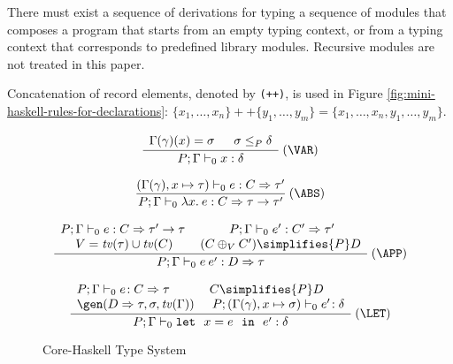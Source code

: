 
There must exist a sequence of derivations for typing a sequence of
modules that composes a program that starts from an empty typing
context, or from a typing context that corresponds to predefined
library modules. Recursive modules are not treated in this paper.

Concatenation of record elements, denoted by {\tt (++)}, is used in
Figure \ref{fig:mini-haskell-rules-for-declarations}: $\{ x_1, \ldots,
x_n \} ++ \{ y_1, \ldots, y_m \} = \{ x_1, \ldots, x_n, y_1,
\ldots, y_m \}$.


\begin{figure}
\[ \begin{array}{cc}
      \displaystyle\frac
        {\begin{array}[t]{lll}
           \Gamma(\gamma)(x) = \sigma\ & \:\sigma \leq_P \delta
         \end{array}}
        {P;\Gamma \vdash_0 x: \delta} \:(\VAR) \\ \\

	\displaystyle\frac
          {(\Gamma(\gamma),x \mapsto \tau) \vdash_0 e: C \Rightarrow \tau'}
	  {P;\Gamma \vdash_0 \lambda x.\:e: C\Rightarrow \tau \rightarrow \tau'} \:(\ABS)  \\ \\

	\displaystyle\frac
	  {\begin{array}[t]{cc}
             P;\Gamma \vdash_0 e: C \Rightarrow \tau' \rightarrow \tau\: &\:
             P;\Gamma \vdash_0 e': C' \Rightarrow \tau' \\
             V = \tv(\tau) \cup \tv(C) & (C \oplus_V C') \simplifies{P} D
           \end{array}}
	{P;\Gamma \vdash_0 e\:e': D\Rightarrow \tau} \:(\APP) \\ \\

	\displaystyle\frac
	 {\begin{array}{ll}
            P;\Gamma \vdash_0 e\!:C \Rightarrow \tau & C \simplifies{P} D\\
             \gen(D\Rightarrow \tau,\sigma,\tv(\Gamma))\: & \:P;(\Gamma(\gamma),x \mapsto\sigma) \vdash_0 e'\!:\delta
          \end{array}}
	 {P;\Gamma \vdash_0 \mlet\ x=e\ \iin\ e':\delta} \:(\LET)
\end{array} \]
\caption{Core-Haskell Type System}
\label{fig:core-haskell-type-system}
\end{figure}

